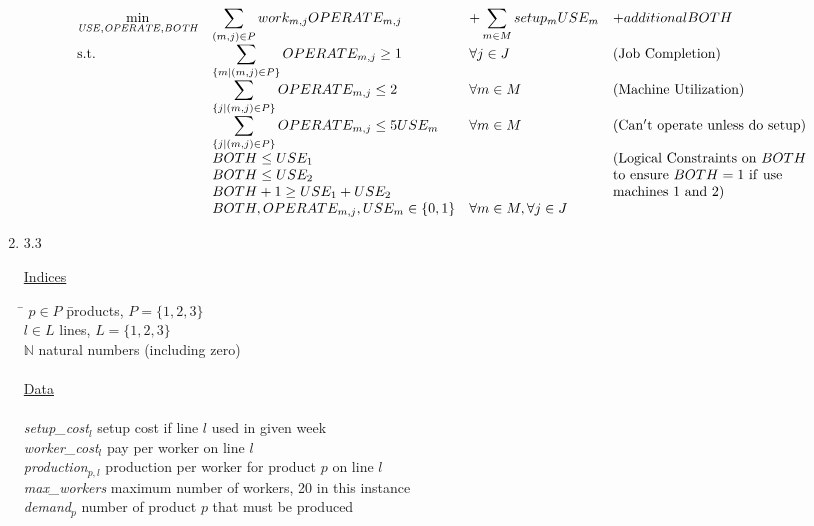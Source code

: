 \documentclass[10pt]{article}
\begin{document}
\begin{enumerate}
 \[
    \begin{array}{llll}
      \displaystyle\min_{ \tiny{\it USE, OPERATE, BOTH}} & \displaystyle\sum_{(m,j)\in P} work_{m,j} OPERATE_{m,j} & + \displaystyle\sum_{m\in M} setup_m USE_m & + additional BOTH \\
      \mbox{s.t.} & \displaystyle\sum_{\{m|(m,j)\in P\}} OPERATE_{m,j} \ge 1 &  \forall j \in J & {\rm (Job~Completion)}\\
& \displaystyle\sum_{\{j|(m,j) \in P\}} OPERATE_{m,j} \le 2 &  \forall m \in M & {\rm (Machine~Utilization)}\\
& \displaystyle\sum_{\{j|(m,j) \in P\}} OPERATE_{m,j} \le 5 USE_m &  \forall m \in M & {\rm (Can't~operate~unless~do~setup)}\\
& BOTH \le USE_1 & & {\rm (Logical~Constraints~on}~BOTH\\
& BOTH \le USE_2 & & {\rm to~ensure~} BOTH=1 {\rm ~if~use}\\
& BOTH +1 \ge USE_1 + USE_2 & & {\rm machines~1~and~2)}\\
& BOTH,OPERATE_{m,j},USE_m \in \{0,1\} & \forall m\in M, \forall j\in J\\
    \end{array}
    \]

\newpage

\item 3.3 

\noindent\underline{Indices}
\begin{tabbing}
\hspace{.5cm} \= $p\in P$ \hspace{2.5cm} \= products, $P=\{1,2,3\}$ \\
\> $l\in L$ \> lines, $L=\{1,2,3\}$\\
\> $\mathbb N$ \> natural numbers (including zero)\\

\\
\noindent\underline{Data}\\%
\\
\> {\it setup\_cost}$_{l}$ \> setup cost if line $l$ used in given week\\
\> {\it worker\_cost}$_{l}$ \> pay per worker on line $l$ \\
\> {\it production}$_{p,l}$ \> production per worker for product $p$ on line $l$ \\
\> {\it max\_workers} \> maximum number of workers, 20 in this instance \\
\> {\it demand}$_{p}$ \> number of product $p$ that must be produced \\
\\


\end{tabbing}
\end{enumerate}
\end{document}
